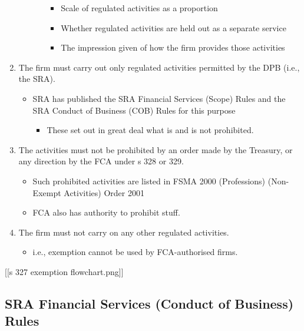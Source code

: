 \documentclass[
]{article}
\providecommand{\tightlist}{%
  \setlength{\itemsep}{0pt}\setlength{\parskip}{0pt}}
\begin{document}
\begin{enumerate}
\begin{itemize}
\begin{itemize}
      \begin{itemize}
      \tightlist
      \item
        Scale of regulated activities as a proportion
      \item
        Whether regulated activities are held out as a separate service
      \item
        The impression given of how the firm provides those activities
      \end{itemize}
    \end{itemize}
  \end{itemize}
\item
  The firm must carry out only regulated activities permitted by the DPB
  (i.e., the SRA).

  \begin{itemize}
  \tightlist
  \item
    SRA has published the SRA Financial Services (Scope) Rules and the
    SRA Conduct of Business (COB) Rules for this purpose

    \begin{itemize}
    \tightlist
    \item
      These set out in great deal what is and is not prohibited.
    \end{itemize}
  \end{itemize}
\item
  The activities must not be prohibited by an order made by the
  Treasury, or any direction by the FCA under s 328 or 329.

  \begin{itemize}
  \tightlist
  \item
    Such prohibited activities are listed in FSMA 2000 (Professions)
    (Non-Exempt Activities) Order 2001
  \item
    FCA also has authority to prohibit stuff.
  \end{itemize}
\item
  The firm must not carry on any other regulated activities.

  \begin{itemize}
  \tightlist
  \item
    i.e., exemption cannot be used by FCA-authorised firms.
  \end{itemize}
\end{enumerate}

{[}{[}s 327 exemption flowchart.png{]}{]}

\hypertarget{sra-financial-services-conduct-of-business-rules}{%
\subsection{SRA Financial Services (Conduct of Business)
Rules}\label{sra-financial-services-conduct-of-business-rules}}
\end{document}
